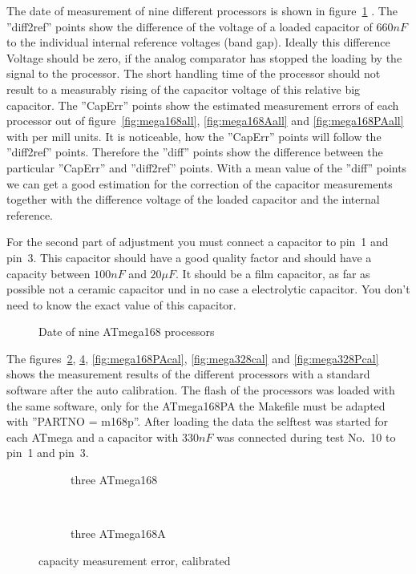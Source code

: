 The date of measurement of nine different processors is shown in figure~\ref{fig:CompAdjust} .
The ''diff2ref'' points show the difference of the voltage of a loaded capacitor of \(660 nF\) to the
individual internal reference voltages (band gap).
Ideally this difference Voltage should be zero, if the analog comparator has stopped the loading by the signal to
the processor. The short handling time of the processor should not result to a measurably rising of the 
capacitor voltage of this relative big capacitor.
The ''CapErr'' points show the estimated measurement errors of each processor out of figure~\ref{fig:mega168all}, \ref{fig:mega168Aall} 
and \ref{fig:mega168PAall} with per mill units.
It is noticeable, how the ''CapErr'' points will follow the ''diff2ref'' points.
Therefore the ''diff'' points show the difference between the particular ''CapErr'' and ''diff2ref'' points.
With a mean value of the ''diff'' points we can get a good estimation for the correction of the capacitor
measurements together with the difference voltage of the loaded capacitor and the internal reference.

For the second part of adjustment you must connect a capacitor to pin~1 and pin~3. This capacitor should have
a good quality factor and should have a capacity between \(100 nF\) and \(20 \mu F\).
It should be a film capacitor, as far as possible not a ceramic capacitor und in no case a electrolytic capacitor.
You don't need to know the exact value of this capacitor.

\begin{figure}[H]
\centering

\caption{Date of nine ATmega168 processors}
\label{fig:CompAdjust}
\end{figure}

The figures~\ref{fig:mega168cal}, \ref{fig:mega168Acal}, \ref{fig:mega168PAcal}, \ref{fig:mega328cal} and \ref{fig:mega328Pcal}
 shows the measurement results
of the different processors with a standard software after the auto calibration.
The flash of the processors was loaded with the same software, only for the ATmega168PA the Makefile must be
adapted with ''PARTNO = m168p''.
After loading the data the selftest was started for each ATmega and a capacitor with \(330 nF\) was connected
during test No.~10 to pin~1 and pin~3.

\begin{figure}[H]
  \begin{subfigure}[b]{9cm}
    \centering
    \resizebox{9cm}{!}{}
    \caption{three ATmega168}
    \label{fig:mega168cal}
  \end{subfigure}
  ~
  \begin{subfigure}[b]{9cm}
    \centering
    \resizebox{9cm}{!}{}
    \caption{three ATmega168A}
    \label{fig:mega168Acal}
  \end{subfigure}
  \caption{capacity measurement error, calibrated}
\end{figure}

